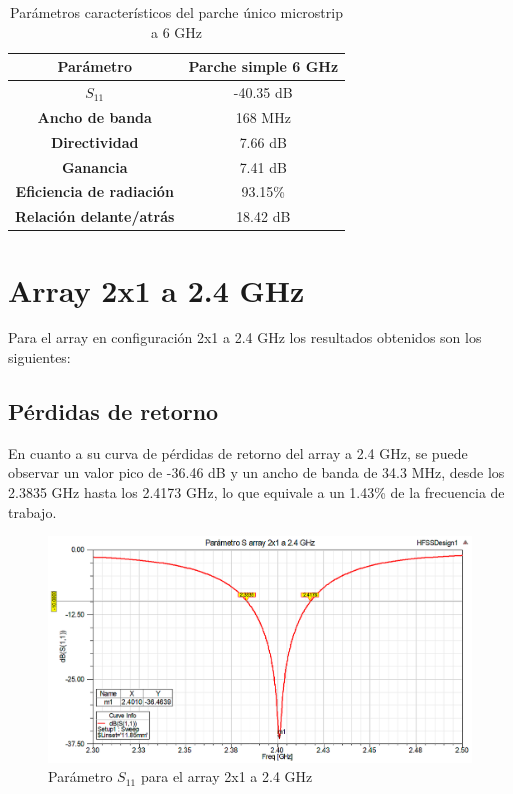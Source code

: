 \begin{table}[H]
  
  
   \small %
   \centering %
   \begin{tabular}{c c} %
   \toprule[\heavyrulewidth]\toprule[\heavyrulewidth]
   \textbf{Parámetro} & \textbf{Parche simple 6 GHz} \\ 
   \midrule
   \textbf{$S_{11}$} & -40.35 dB \\
   \textbf{Ancho de banda} & 168 MHz \\
   \textbf{Directividad} & 7.66 dB \\
   \textbf{Ganancia} & 7.41 dB \\
   \textbf{Eficiencia de radiación} & 93.15\% \\
   \textbf{Relación delante/atrás} & 18.42 dB \\

   \bottomrule[\heavyrulewidth] 
   \end{tabular}
   \caption{Parámetros característicos del parche único microstrip a 6 GHz} 
    \label{tab:res1x12}
\end{table}









\section{Array 2x1 a 2.4 GHz}
\par Para el array en configuración 2x1 a 2.4 GHz los resultados obtenidos son los siguientes:

\subsection{Pérdidas de retorno}
\par En cuanto a su curva de pérdidas de retorno del array a 2.4 GHz, se puede observar un valor pico de -36.46 dB y un ancho de banda de 34.3 MHz, desde los 2.3835 GHz hasta los 2.4173 GHz, lo que equivale a un 1.43\% de la frecuencia de trabajo.
\\
\begin{figure}[H]
    \centering
        \includegraphics[width=\textwidth]{archivos/analisis/2x11/1}
        \caption{Parámetro $S_{11}$ para el array 2x1 a 2.4 GHz}
        \label{fig:s2x11}
\end{figure}

